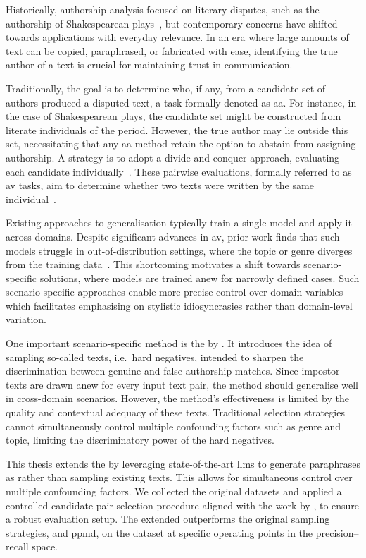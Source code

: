 Historically, authorship analysis focused on literary disputes, such as the authorship of Shakespearean plays~\citep{neal_surveying_2018,stamatatos_survey_2009}, but contemporary concerns have shifted towards applications with everyday relevance.
In an era where large amounts of text can be copied, paraphrased, or fabricated with ease, identifying the true author of a text is crucial for maintaining trust in communication. 

Traditionally, the goal is to determine who, if any, from a candidate set of authors produced a disputed text, a task formally denoted as \ac{aa}. 
For instance, in the case of Shakespearean plays, the candidate set might be constructed from literate individuals of the period.
However, the true author may lie outside this set, necessitating that any \ac{aa} method retain the option to abstain from assigning authorship. 
A strategy is to adopt a divide-and-conquer approach, evaluating each candidate individually~\citep{tyo_state_2022,barlas_cross_domain_2020}. 
These pairwise evaluations, formally referred to as \ac{av} tasks, aim to determine whether two texts were written by the same individual~\citep{koppel_authorship_2004}. 

Existing approaches to generalisation typically train a single model and apply it across domains.
Despite significant advances in \ac{av}, prior work finds that such models struggle in out-of-distribution settings, where the topic or genre diverges from the training data~\citep{Sundararajan_style_18,bischoff_importance_2020,li_learning_2025}. 
This shortcoming motivates a shift towards scenario-specific solutions, where models are trained anew for narrowly defined cases. 
Such scenario-specific approaches enable more precise control over domain variables which facilitates emphasising on stylistic idiosyncrasies rather than domain-level variation.

One important scenario-specific method is the \impAppr{} by \citet{koppel_determining_2014}.
It introduces the idea of sampling so-called \imp{} texts, i.e.\ hard negatives, intended to sharpen the discrimination between genuine and false authorship matches. 
Since impostor texts are drawn anew for every input text pair, the method should generalise well in cross-domain scenarios.
However, the method's effectiveness is limited by the quality and contextual adequacy of these \imp{} texts. 
Traditional \imp{} selection strategies cannot simultaneously control multiple confounding factors such as genre and topic, limiting the discriminatory power of the hard negatives.

This thesis extends the \impAppr{} by leveraging state-of-the-art \acp{llm} to generate paraphrases as \imps{} rather than sampling existing texts.
This allows for simultaneous control over multiple confounding factors.
We collected the original datasets and applied a controlled candidate-pair selection procedure aligned with the work by \citet{koppel_determining_2014}, to ensure a robust evaluation setup.
The extended \impAppr{} outperforms the original sampling strategies, \unmasking{} and \acs{ppmd}, on the \dataStudent{} dataset at specific operating points in the precision–recall space.

